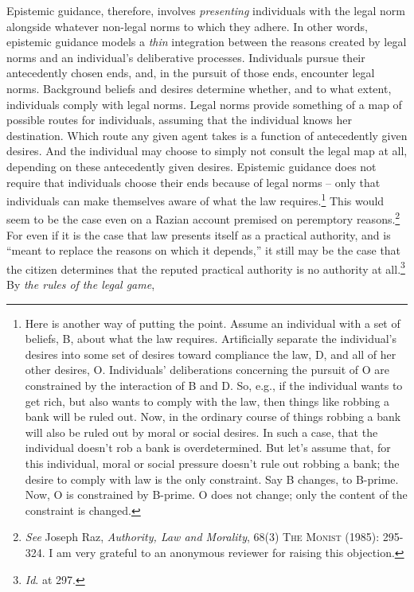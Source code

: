 Epistemic guidance, therefore, involves \emph{presenting} individuals
with the legal norm alongside whatever non-legal norms to which they
adhere. In other words, epistemic guidance models a \emph{thin}
integration between the reasons created by legal norms and an
individual's deliberative processes. Individuals pursue their
antecedently chosen ends, and, in the pursuit of those ends, encounter
legal norms. Background beliefs and desires determine whether, and to
what extent, individuals comply with legal norms. Legal norms provide
something of a map of possible routes for individuals, assuming that the
individual knows her destination. Which route any given agent takes is a
function of antecedently given desires. And the individual may choose to
simply not consult the legal map at all, depending on these antecedently
given desires. Epistemic guidance does not require that individuals
choose their ends because of legal norms -- only that individuals can
make themselves aware of what the law requires.\footnote{Here is another
  way of putting the point. Assume an individual with a set of beliefs,
  B, about what the law requires. Artificially separate the individual's
  desires into some set of desires toward compliance the law, D, and all
  of her other desires, O. Individuals' deliberations concerning the
  pursuit of O are constrained by the interaction of B and D. So, e.g.,
  if the individual wants to get rich, but also wants to comply with the
  law, then things like robbing a bank will be ruled out. Now, in the
  ordinary course of things robbing a bank will also be ruled out by
  moral or social desires. In such a case, that the individual doesn't
  rob a bank is overdetermined. But let's assume that, for this
  individual, moral or social pressure doesn't rule out robbing a bank;
  the desire to comply with law is the only constraint. Say B changes,
  to B-prime. Now, O is constrained by B-prime. O does not change; only
  the content of the constraint is changed.} This would seem to be the
case even on a Razian account premised on peremptory reasons.\footnote{\emph{See}
  Joseph Raz, \emph{Authority, Law and Morality}, 68(3) \textsc{The
  Monist} (1985): 295-324. I am very grateful to an anonymous reviewer
  for raising this objection.} For even if it is the case that law
presents itself as a practical authority, and is ``meant to replace the
reasons on which it depends,'' it still may be the case that the citizen
determines that the reputed practical authority is no authority at
all.\footnote{\emph{Id}. at 297.} By \emph{the rules of the legal game},
